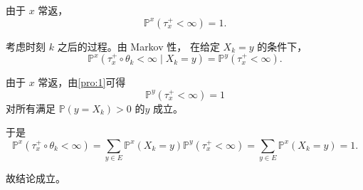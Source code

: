 \documentclass{ctexart}
\begin{document}
\begin{solution}

  由于 \(x\) 常返，
  \[
    \mathbb P^x(\tau_x^+<\infty)=1.
  \]

  考虑时刻 \(k\) 之后的过程。由 Markov 性，
  在给定 \(X_k=y\) 的条件下，
  \[
    \mathbb P^x(\tau_x^+\circ\theta_k<\infty\mid X_k=y)
    =
    \mathbb P^y(\tau_x^+<\infty).
  \]

  由于 \(x\) 常返，由\ref{pro:1}可得
  \[
    \mathbb P^y(\tau_x^+<\infty)=1
  \]
  对所有满足 \(\mathbb{P} (y=X_k)>0\) 的\(y \) 成立。

  于是
  \[
    \mathbb P^x(\tau_x^+\circ\theta_k<\infty)
    =
    \sum_{y\in E}
    \mathbb P^x(X_k=y)
    \mathbb P^y(\tau_x^+<\infty)
    =
    \sum_{y\in E}\mathbb P^x(X_k=y)
    =
    1.
  \]

  故结论成立。

\end{solution}
\end{document}
